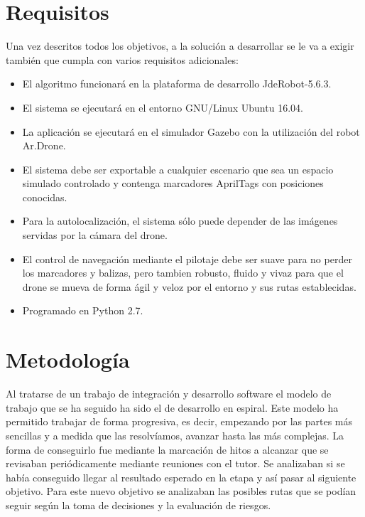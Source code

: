 \section{Requisitos}
\hspace{1cm} Una vez descritos todos los objetivos, a la solución a desarrollar se le va a exigir también que cumpla con varios requisitos adicionales:

\begin{itemize}
		\item El algoritmo funcionará en la plataforma de desarrollo JdeRobot-5.6.3.
		\item El sistema se ejecutará en el entorno GNU/Linux Ubuntu 16.04.
		\item La aplicación se ejecutará en el simulador Gazebo con la utilización del robot Ar.Drone.
		\item El sistema debe ser exportable a cualquier escenario que sea un espacio simulado controlado y contenga marcadores AprilTags con posiciones conocidas.
		\item Para la autolocalización, el sistema sólo puede depender de las imágenes servidas por la cámara del drone.
		\item El control de navegación mediante el pilotaje debe ser suave para no perder los marcadores y balizas, pero tambien robusto, fluido y vivaz para que el drone se mueva de forma ágil y veloz por el entorno y sus rutas establecidas.
		\item Programado en Python 2.7.
\end{itemize}


\section{Metodología}
\hspace{1cm} Al tratarse de un trabajo de integración y desarrollo software el modelo de trabajo que se ha seguido ha sido el de desarrollo en espiral. Este modelo ha permitido trabajar de forma progresiva, es decir, empezando por las partes más sencillas y a medida que las resolvíamos, avanzar hasta las más complejas. La forma de conseguirlo fue mediante la marcación de hitos a alcanzar que se revisaban periódicamente mediante reuniones con el tutor. Se analizaban si se había conseguido llegar al resultado esperado en la etapa y así pasar al siguiente objetivo. Para este nuevo objetivo se analizaban las posibles rutas que se podían seguir según la toma de decisiones y la evaluación de riesgos.


